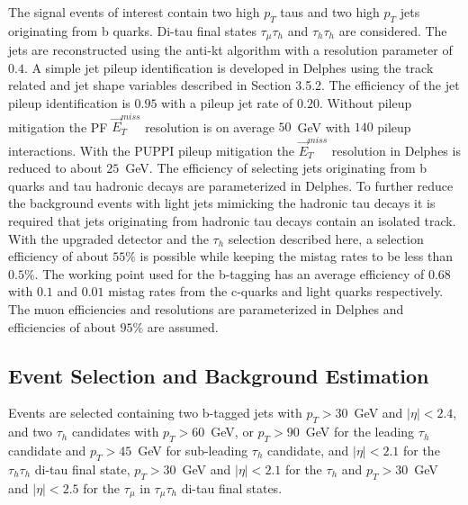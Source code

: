 The signal events of interest contain two high $p_{T}$ taus and two high $p_{T}$ jets originating from b quarks. Di-tau final states $\tau_{\mu}\tau_{h}$ and $\tau_{h}\tau_{h}$ are considered. The jets are reconstructed using the anti-kt algorithm with a resolution parameter of $0.4$. A simple jet pileup identification is developed in Delphes using the track related and jet shape variables described in Section 3.5.2. The efficiency of the jet pileup identification is $0.95$ with a pileup jet rate of $0.20$. Without pileup mitigation the PF $\vec{E}_{T}^{miss}$ resolution is on average $50$~GeV with $140$ pileup interactions. With the PUPPI pileup mitigation the $\vec{E}_{T}^{miss}$ resolution in Delphes is reduced to about $25$~GeV.  The efficiency of selecting jets originating from b quarks and tau hadronic decays are parameterized in Delphes. To further reduce the background events with light jets mimicking the hadronic tau decays it is required that jets originating from hadronic tau decays contain an isolated track. With the upgraded \phasetwo detector and the $\tau_{h}$ selection described here, a selection efficiency of about $55\%$ is possible while keeping the mistag rates to be less than $0.5\%$. The working point used for the b-tagging has an average efficiency of $0.68$ with $0.1$ and $0.01$ mistag rates from the c-quarks and light quarks respectively.  The muon efficiencies and resolutions are parameterized in Delphes and efficiencies of about $95\%$ are assumed.

\subsection{Event Selection and Background Estimation}
Events are selected containing two b-tagged jets with $p_{T}>30$~GeV
and $|\eta|<2.4$, and two $\tau_{h}$ candidates with $p_{T}>60$~GeV, or $p_{T}>90$~GeV
for the leading $\tau_h$ candidate and $p_{T}>45$~GeV for sub-leading $\tau_h$ candidate, and
$|\eta|<2.1$ for the $\tau_{h}\tau_{h}$ di-tau final state, $p_{T}>30$~GeV
and $|\eta|<2.1$  for the $\tau_{h}$ and $p_{T}>30$~GeV and $|\eta|<2.5$
for the $\tau_{\mu}$ in $\tau_{\mu}\tau_{h}$ di-tau final states. 

